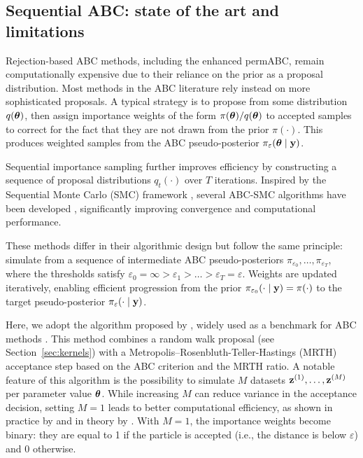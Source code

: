 \subsection{Sequential ABC: state of the art and limitations}
\label{sec:abc_smc}
Rejection-based ABC methods, including the enhanced permABC, remain computationally expensive due to their reliance on the prior as a proposal distribution. 
Most methods in the ABC literature rely instead on more sophisticated proposals. A typical strategy is to propose from some distribution \( q(\boldsymbol{\theta}) \), then assign importance weights  of the form \( \pi(\boldsymbol{\theta})/q(\boldsymbol{\theta}) \) to accepted samples to correct for the fact that they are not drawn from the prior \( \pi(\cdot) \). This produces weighted samples from the ABC pseudo-posterior \( \pi_\varepsilon(\boldsymbol{\theta} \mid \mathbf{y}) \). 

Sequential importance sampling further improves efficiency by constructing a sequence of proposal distributions \( q_t(\cdot) \) over \( T \) iterations. Inspired by the Sequential Monte Carlo (SMC) framework \citep{delmoralSequentialMonteCarlo2006a}, several ABC-SMC algorithms have been developed \citep{sisson2007sequential,sissonCorrectionSissonSequential2009, toniApproximateBayesianComputation2008, beaumontAdaptiveApproximateBayesian2009b, delmoralAdaptiveSequentialMonte2012}, significantly improving convergence and computational performance.

These methods differ in their algorithmic design but follow the same principle: simulate from a sequence of intermediate ABC pseudo-posteriors \( \pi_{\varepsilon_0}, \dots, \pi_{\varepsilon_T} \), where the thresholds satisfy \( \varepsilon_0 = \infty > \varepsilon_1 > \dots > \varepsilon_T = \varepsilon \). Weights are updated iteratively, enabling efficient progression from the prior \( \pi_{\varepsilon_0}(\cdot \mid \mathbf{y}) = \pi(\cdot) \) to the target pseudo-posterior \( \pi_\varepsilon(\cdot \mid \mathbf{y}) \).

Here, we adopt the algorithm proposed by \citet{delmoralAdaptiveSequentialMonte2012}, widely used as a benchmark for ABC methods \citep{clarte2021componentwise}. This method combines a random walk proposal (see Section~\ref{sec:kernels}) with a Metropolis–Rosenbluth-Teller-Hastings (MRTH) acceptance step based on the ABC criterion and the MRTH ratio. 
%
A notable feature of this algorithm is the possibility to simulate \( M \) datasets \( \mathbf{z}^{(1)}, \dots, \mathbf{z}^{(M)} \) per parameter value \( \boldsymbol{\theta} \). 
While increasing \( M \) can reduce variance in the acceptance decision, setting \( M = 1 \) leads to better computational efficiency, as shown in practice by \citet{delmoralAdaptiveSequentialMonte2012} and in theory by \citet{bornn2017use}. 
With $M=1$, the importance weights become binary: they are equal to 1 if the particle is accepted (i.e., the distance is below \( \varepsilon \)) and 0 otherwise.


